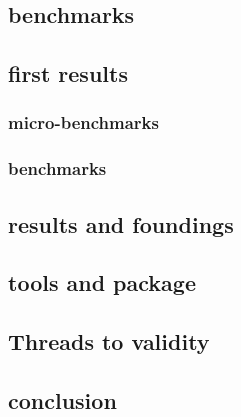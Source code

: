 \subsection{benchmarks}

\subsection{first results}

\subsubsection{micro-benchmarks}

\subsubsection{benchmarks}

\subsection{results and foundings}

\subsection{tools and package}

\subsection{Threads to validity}

\subsection{conclusion}

